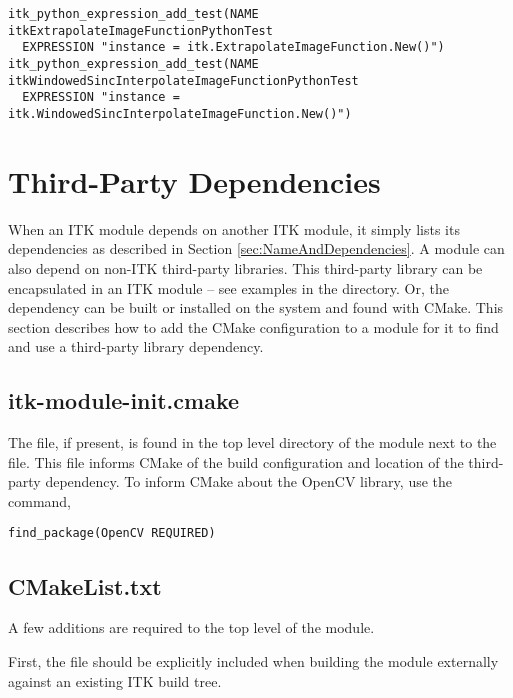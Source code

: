\begin{verbatim}
itk_python_expression_add_test(NAME itkExtrapolateImageFunctionPythonTest
  EXPRESSION "instance = itk.ExtrapolateImageFunction.New()")
itk_python_expression_add_test(NAME itkWindowedSincInterpolateImageFunctionPythonTest
  EXPRESSION "instance = itk.WindowedSincInterpolateImageFunction.New()")
\end{verbatim}


\section{Third-Party Dependencies}
\label{sec:ThirdParty}

When an ITK module depends on another ITK module, it simply lists its
dependencies as described in Section \ref{sec:NameAndDependencies}. A module
can also depend on non-ITK third-party libraries. This third-party library can
be encapsulated in an ITK module -- see examples in the
 directory. Or, the dependency can be built or
installed on the system and found with CMake. This section describes how to
add the CMake configuration to a module for it to find and use a third-party
library dependency.


\subsection{itk-module-init.cmake}

The  file, if present, is found in the top level
directory of the module next to the  file. This file
informs CMake of the build configuration and location of the third-party
dependency. To inform CMake about the OpenCV library, use the
 command,

\begin{verbatim}
find_package(OpenCV REQUIRED)
\end{verbatim}


\subsection{CMakeList.txt}

A few additions are required to the top level  of the
module.

First, the  file should be explicitly included
when building the module externally against an existing ITK build tree.

